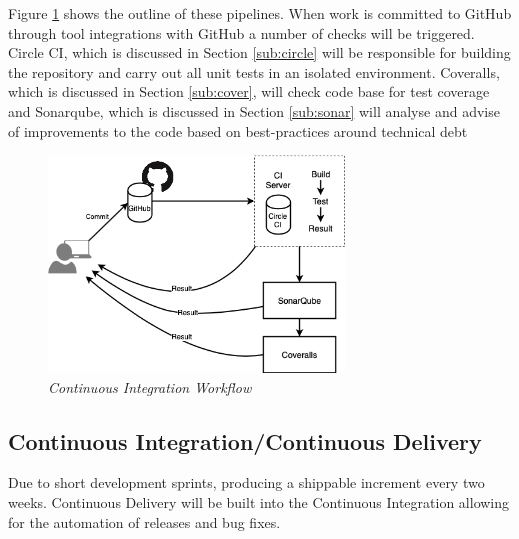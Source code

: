 Figure \ref{img:ci} shows the outline of these pipelines. When work is committed to GitHub through tool integrations with GitHub a number of checks will be triggered. Circle CI, which is discussed in Section \ref{sub:circle} will be responsible for building the repository and carry out all unit tests in an isolated environment. Coveralls, which is discussed in Section \ref{sub:cover}, will check code base for test coverage and Sonarqube, which is discussed in Section \ref{sub:sonar} will analyse and advise of improvements to the code based on best-practices around technical debt
\begin{figure}[!ht]
\centering
\includegraphics*[width=0.7\textwidth]{images/cisample.png}
\caption{\em Continuous Integration Workflow}
\label{img:ci}
\end{figure}

\subsection{Continuous Integration/Continuous Delivery}
Due to short development sprints, producing a shippable increment every two weeks. Continuous Delivery will be built into the Continuous Integration allowing for the automation of releases and bug fixes.

